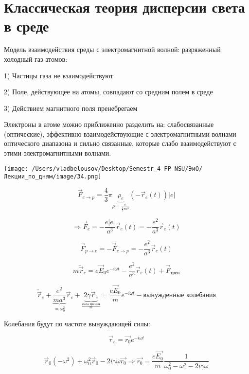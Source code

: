 \documentclass[12pt, a4paper]{report}
\begin{document}
\fi


\section{Классическая теория дисперсии света в среде}

Модель взаимодействия среды с электромагнитной волной: разряженный холодный газ атомов: 

1) Частицы газа не взаимодействуют 

2) Поле, действующее на атомы, совпадают со средним полем в среде

3) Действием магнитного поля пренебрегаем 

Электроны в атоме можно приближенно разделить на: слабосвязанные (оптические), эффективно взаимодействующие с электромагнитными волнами оптического диапазона  и сильно связанные, которые слабо взаимодействуют с этими электромагнитными волнами. 
\begin{center}
    \texttt{[image: /Users/vladbelousov/Desktop/Semestr\_4-FP-NSU/ЭиО/Лекции\_по\_дням/image/34.png]}
\end{center}
\[ \vec{F}_{e \to p } = \frac{4}{3 }  \pi \underbrace{\rho_e}_{ \rho = \frac{e}{\frac{4 }{3 }  \pi a ^3 } } (- \vec{r }_e (t ) )|e|   \] 

\[\Rightarrow \vec{F } _e = - \frac{e |e|}{a ^3 } \vec{r}_e (t ) = - \frac{e^2 }{a^3 } \vec{r } _e (t )      \] 

\[ \vec{F } _{p \to  e } = - \vec{ F } _{e \to  p } = - \frac{e ^2 } { a ^3 }\vec{r } _e (t )    \] 

\[ m\ddot{\vec{r}  }_e = e \vec{E }  _0 e ^{- i \omega t } - \frac{e^ 2 }{a ^3 }   \vec{r } _e(t ) +\vec{F } _{\text{трен} }    \] 

\[ \ddot{\vec{r } }_e + \underbrace{\frac{e ^2 }{m a^ 3}}_{= \omega_0 ^2 } \vec{r } _e +\underbrace{2 \gamma \dot{\vec{r } }_e}_{\frac{\text{сила трения} }{m} } = \frac{e \vec{E } _0 }{m }e^{- i \omega t }  -\text{вынужденные колебания}    \] 

Колебания будут по частоте вынуждающей силы:

\[ \vec{r        }_e  = \vec{r_0 } e^{- i \omega t }    \] 

\[ \vec{r } _{0 } ( -\omega ^2 ) + \omega_0^2 \vec{r } _0 - 2 i \gamma \omega \vec{r_0} \Rightarrow \vec{r_0 } = \frac{e \vec{E_0 } }{m } \frac{1}{\omega_0 ^2 - \omega ^2 - 2 i \gamma \omega}      \] 
\end{document}
